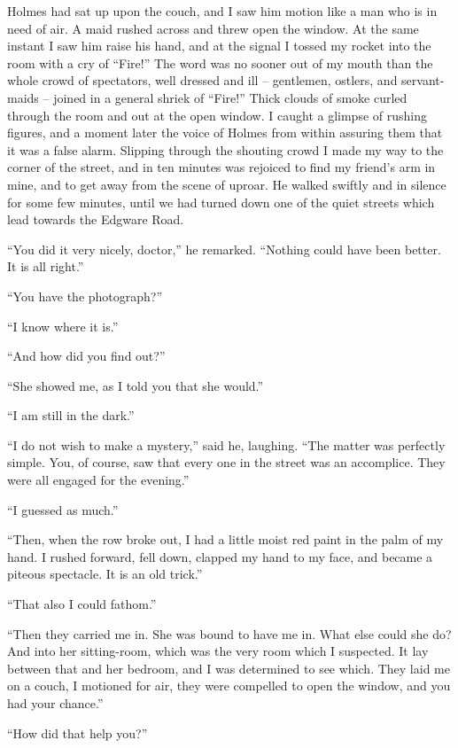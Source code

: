 Holmes had sat up upon the couch, and I saw him motion
like a man who is in need of air. A maid rushed across and
threw open the window. At the same instant I saw him raise
his hand, and at the signal I tossed my rocket into the room
with a cry of “Fire!” The word was no sooner out of my
mouth than the whole crowd of spectators, well dressed and
ill -- gentlemen, ostlers, and servant-maids -- joined in a general
shriek of “Fire!” Thick clouds of smoke curled through
the room and out at the open window. I caught a glimpse
of rushing figures, and a moment later the voice of Holmes
from within assuring them that it was a false alarm. Slipping
through the shouting crowd I made my way to the corner of
the street, and in ten minutes was rejoiced to find my friend’s
arm in mine, and to get away from the scene of uproar. He
walked swiftly and in silence for some few minutes, until we
had turned down one of the quiet streets which lead towards
the Edgware Road.

“You did it very nicely, doctor,” he remarked. “Nothing
could have been better. It is all right.”

“You have the photograph?”

“I know where it is.”

“And how did you find out?”

“She showed me, as I told you that she would.”

“I am still in the dark.”

“I do not wish to make a mystery,” said he, laughing.
“The matter was perfectly simple. You, of course, saw that
every one in the street was an accomplice. They were all engaged
for the evening.”

“I guessed as much.”

“Then, when the row broke out, I had a little moist red
paint in the palm of my hand. I rushed forward, fell down,
clapped my hand to my face, and became a piteous spectacle.
It is an old trick.”

“That also I could fathom.”

“Then they carried me in. She was bound to have me in.
What else could she do? And into her sitting-room, which
was the very room which I suspected. It lay between that
and her bedroom, and I was determined to see which. They
laid me on a couch, I motioned for air, they were compelled
to open the window, and you had your chance.”

“How did that help you?”

